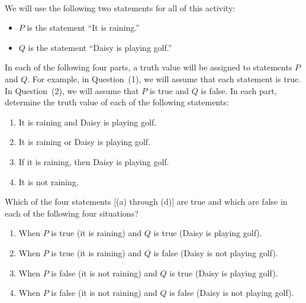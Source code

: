 \begin{previewactivity}\label{PA:truth} \hfill \\
We will use the following two statements for all of this activity:
\begin{itemize}
\item $P$  is the statement ``It is raining.'' 
\item $Q$  is the statement ``Daisy is playing golf.''
\end{itemize}
In each of the following four parts, a truth value will be assigned to statements $P$ and 
$Q$.  For example, in Question~(1), we will assume that each statement is true.  In Question~(2), we will assume that $P$ is true and $Q$ is false.  In each part, determine the truth value of each of the following statements:
\renewcommand{\labelenumi}{(\textbf{\alph{enumi}})}
  \begin{enumerate}
    \item {} It is raining and Daisy is playing golf.
    \item {}  It is raining or Daisy is playing golf.
    \item {}	If it is raining, then Daisy is playing golf.
    \item {}	It is not raining.
  \end{enumerate}
\renewcommand{\labelenumi}{\textbf{\arabic{enumi}.}}

\newpar
Which of the four statements [(a) through (d)] are true and which are false in each of the following four situations?
\begin{enumerate}
\item When $P$ is true (it is raining) and  $Q$ is true (Daisy is playing golf).  

\item When  $P$ is true (it is raining) and  $Q$ is false (Daisy is not playing golf).   

\item When  $P$ is false (it is not raining) and  $Q$ is true (Daisy is playing golf).    

\item When  $P$ is false (it is not raining) and  $Q$ is false (Daisy is not playing golf).    
\end{enumerate}
\hbreak
\end{previewactivity}
